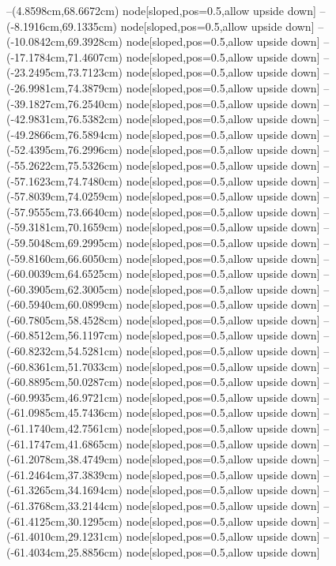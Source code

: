 --(4.8598cm,68.6672cm) node[sloped,pos=0.5,allow upside down]{\ArrowIn}
--(-8.1916cm,69.1335cm) node[sloped,pos=0.5,allow upside down]{\ArrowIn}
--(-10.0842cm,69.3928cm) node[sloped,pos=0.5,allow upside down]{\ArrowIn}
--(-17.1784cm,71.4607cm) node[sloped,pos=0.5,allow upside down]{\ArrowIn}
--(-23.2495cm,73.7123cm) node[sloped,pos=0.5,allow upside down]{\ArrowIn}
--(-26.9981cm,74.3879cm) node[sloped,pos=0.5,allow upside down]{\ArrowIn}
--(-39.1827cm,76.2540cm) node[sloped,pos=0.5,allow upside down]{\ArrowIn}
--(-42.9831cm,76.5382cm) node[sloped,pos=0.5,allow upside down]{\ArrowIn}
--(-49.2866cm,76.5894cm) node[sloped,pos=0.5,allow upside down]{\ArrowIn}
--(-52.4395cm,76.2996cm) node[sloped,pos=0.5,allow upside down]{\ArrowIn}
--(-55.2622cm,75.5326cm) node[sloped,pos=0.5,allow upside down]{\ArrowIn}
--(-57.1623cm,74.7480cm) node[sloped,pos=0.5,allow upside down]{\ArrowIn}
--(-57.8039cm,74.0259cm) node[sloped,pos=0.5,allow upside down]{\arrowIn}
--(-57.9555cm,73.6640cm) node[sloped,pos=0.5,allow upside down]{\arrowIn}
--(-59.3181cm,70.1659cm) node[sloped,pos=0.5,allow upside down]{\ArrowIn}
--(-59.5048cm,69.2995cm) node[sloped,pos=0.5,allow upside down]{\arrowIn}
--(-59.8160cm,66.6050cm) node[sloped,pos=0.5,allow upside down]{\ArrowIn}
--(-60.0039cm,64.6525cm) node[sloped,pos=0.5,allow upside down]{\ArrowIn}
--(-60.3905cm,62.3005cm) node[sloped,pos=0.5,allow upside down]{\ArrowIn}
--(-60.5940cm,60.0899cm) node[sloped,pos=0.5,allow upside down]{\ArrowIn}
--(-60.7805cm,58.4528cm) node[sloped,pos=0.5,allow upside down]{\ArrowIn}
--(-60.8512cm,56.1197cm) node[sloped,pos=0.5,allow upside down]{\ArrowIn}
--(-60.8232cm,54.5281cm) node[sloped,pos=0.5,allow upside down]{\ArrowIn}
--(-60.8361cm,51.7033cm) node[sloped,pos=0.5,allow upside down]{\ArrowIn}
--(-60.8895cm,50.0287cm) node[sloped,pos=0.5,allow upside down]{\ArrowIn}
--(-60.9935cm,46.9721cm) node[sloped,pos=0.5,allow upside down]{\ArrowIn}
--(-61.0985cm,45.7436cm) node[sloped,pos=0.5,allow upside down]{\ArrowIn}
--(-61.1740cm,42.7561cm) node[sloped,pos=0.5,allow upside down]{\ArrowIn}
--(-61.1747cm,41.6865cm) node[sloped,pos=0.5,allow upside down]{\ArrowIn}
--(-61.2078cm,38.4749cm) node[sloped,pos=0.5,allow upside down]{\ArrowIn}
--(-61.2464cm,37.3839cm) node[sloped,pos=0.5,allow upside down]{\ArrowIn}
--(-61.3265cm,34.1694cm) node[sloped,pos=0.5,allow upside down]{\ArrowIn}
--(-61.3768cm,33.2144cm) node[sloped,pos=0.5,allow upside down]{\arrowIn}
--(-61.4125cm,30.1295cm) node[sloped,pos=0.5,allow upside down]{\ArrowIn}
--(-61.4010cm,29.1231cm) node[sloped,pos=0.5,allow upside down]{\ArrowIn}
--(-61.4034cm,25.8856cm) node[sloped,pos=0.5,allow upside down]{\ArrowIn}
